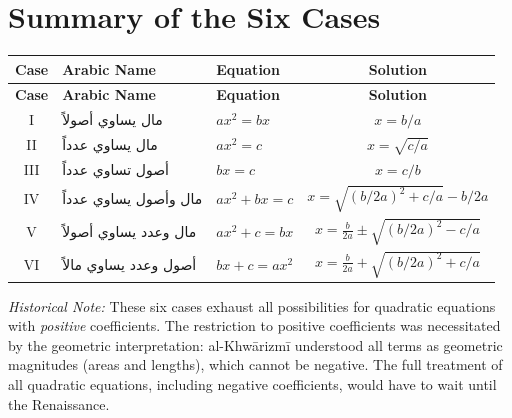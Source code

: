 \documentclass[11pt,a4paper]{book}
\newcommand{\cnote}[1]{\textcolor{notecolor}{\textit{#1}}}
\newcommand{\ar}[1]{{\arabicfont\beginR #1\endR}}
\begin{document}
\newpage

\appendix
\chapter{Summary of the Six Cases}
\label{app:six-cases}

\begin{center}
\renewcommand{\arraystretch}{1.6}
\begin{longtable}{|c|l|l|c|}
\hline
\textbf{Case} & \textbf{Arabic Name} & \textbf{Equation} & \textbf{Solution} \\
\hline
\endfirsthead
\hline
\textbf{Case} & \textbf{Arabic Name} & \textbf{Equation} & \textbf{Solution} \\
\hline
\endhead
\hline
\endfoot
I & \ar{مال يساوي أصولاً} & $ax^2 = bx$ & $x = b/a$ \\
\hline
II & \ar{مال يساوي عدداً} & $ax^2 = c$ & $x = \sqrt{c/a}$ \\
\hline
III & \ar{أصول تساوي عدداً} & $bx = c$ & $x = c/b$ \\
\hline
IV & \ar{مال وأصول يساوي عدداً} & $ax^2 + bx = c$ & $x = \sqrt{(b/2a)^2 + c/a} - b/2a$ \\
\hline
V & \ar{مال وعدد يساوي أصولاً} & $ax^2 + c = bx$ & $x = \frac{b}{2a} \pm \sqrt{(b/2a)^2 - c/a}$ \\
\hline
VI & \ar{أصول وعدد يساوي مالاً} & $bx + c = ax^2$ & $x = \frac{b}{2a} + \sqrt{(b/2a)^2 + c/a}$ \\
\hline
\end{longtable}
\end{center}

\vspace{0.5cm}

\cnote{Historical Note:} These six cases exhaust all possibilities for quadratic equations with \textit{positive} coefficients. The restriction to positive coefficients was necessitated by the geometric interpretation: al-Khw\=arizm\={i} understood all terms as geometric magnitudes (areas and lengths), which cannot be negative. The full treatment of all quadratic equations, including negative coefficients, would have to wait until the Renaissance.

\newpage

\end{document}
